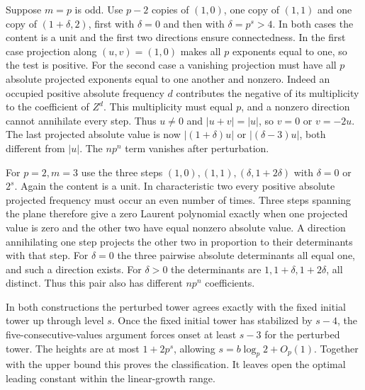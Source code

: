 Suppose $m=p$ is odd. Use $p-2$ copies of $(1,0)$, one copy
of $(1,1)$ and one copy of $(1+\delta,2)$, first with $\delta=0$
and then with $\delta=p^s>4$. In both cases the content is a unit
and the first two directions ensure connectedness. In the first
case projection along $(u,v)=(1,0)$ makes all $p$ exponents equal
to one, so the test is positive. For the second case a vanishing
projection must have all $p$ absolute projected exponents equal
to one another and nonzero. Indeed an occupied positive absolute
frequency $d$ contributes the negative of its multiplicity to the
coefficient of $Z^d$. This multiplicity must equal $p$, and a
nonzero direction cannot annihilate every step. Thus $u\ne0$ and
$|u+v|=|u|$, so $v=0$ or $v=-2u$. The last projected absolute
value is now $|(1+\delta)u|$ or $|(\delta-3)u|$, both different
from $|u|$. The $np^n$ term vanishes after perturbation.

For $p=2,m=3$ use the three steps
$(1,0),(1,1),(\delta,1+2\delta)$ with $\delta=0$ or $2^s$.
Again the content is a unit. In characteristic two every positive
absolute projected frequency must occur an even number of times.
Three steps spanning the plane therefore give a zero Laurent
polynomial exactly when one projected value is zero and the other
two have equal nonzero absolute value. A direction annihilating
one step projects the other two in proportion to their determinants
with that step. For $\delta=0$ the three pairwise absolute
determinants all equal one, and such a direction exists. For $\delta>0$
the determinants are $1,1+\delta,1+2\delta$, all distinct.
Thus this pair also has different $np^n$ coefficients.

In both constructions the perturbed tower agrees exactly with the
fixed initial tower up through level $s$. Once the fixed initial
tower has stabilized by $s-4$, the five-consecutive-values argument
forces onset at least $s-3$ for the perturbed tower. The heights
are at most $1+2p^s$, allowing $s=b\log_p 2+O_p(1)$. Together with
the upper bound this proves the classification. It leaves open the
optimal leading constant within the linear-growth range.
